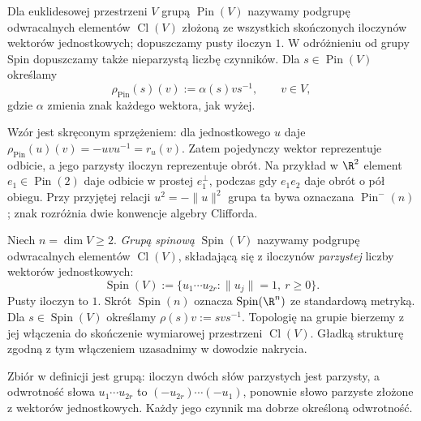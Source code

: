\begin{definicja}
\label{def:pin-grupa}
Dla euklidesowej przestrzeni $V$ grupą $\operatorname{Pin}(V)$
nazywamy podgrupę odwracalnych elementów $\operatorname{Cl}(V)$
złożoną ze wszystkich skończonych iloczynów wektorów
jednostkowych; dopuszczamy pusty iloczyn $1$.
W odróżnieniu od grupy Spin dopuszczamy także nieparzystą
liczbę czynników. Dla $s\in\operatorname{Pin}(V)$ określamy
\[
 \rho_{\mathrm{Pin}}(s)(v):=\alpha(s)v s^{-1},
 \qquad v\in V,
\]
gdzie $\alpha$ zmienia znak każdego wektora, jak wyżej.
\end{definicja}

Wzór jest skręconym sprzężeniem: dla jednostkowego $u$
daje $\rho_{\mathrm{Pin}}(u)(v)=-uvu^{-1}=r_u(v)$.
Zatem pojedynczy wektor reprezentuje odbicie, a jego parzysty
iloczyn reprezentuje obrót. Na przykład w $\R^2$ element
$e_1\in\operatorname{Pin}(2)$ daje odbicie w prostej
$e_1^\perp$, podczas gdy $e_1e_2$ daje obrót o pół obiegu.
Przy przyjętej relacji $u^2=-\|u\|^2$ grupa ta bywa
oznaczana $\operatorname{Pin}^{-}(n)$; znak rozróżnia dwie
konwencje algebry Clifforda.

\begin{definicja}
\label{def:spin-grupa}
Niech $n=\dim V\geq2$. \emph{Grupą spinową}
$\operatorname{Spin}(V)$ nazywamy podgrupę
odwracalnych elementów $\operatorname{Cl}(V)$,
składającą się z iloczynów \emph{parzystej}
liczby wektorów jednostkowych:
\[
 \operatorname{Spin}(V)
 :=\{u_1\cdots u_{2r}:\|u_j\|=1,\ r\geq0\}.
\]
Pusty iloczyn to $1$. Skrót
$\operatorname{Spin}(n)$ oznacza
$\operatorname{Spin}(\R^n)$ ze standardową metryką.
Dla $s\in\operatorname{Spin}(V)$ określamy
$\rho(s)v:=svs^{-1}$.
Topologię na grupie bierzemy z jej włączenia do skończenie
wymiarowej przestrzeni $\operatorname{Cl}(V)$. Gładką strukturę
zgodną z tym włączeniem uzasadnimy w dowodzie nakrycia.
\end{definicja}

Zbiór w definicji jest grupą: iloczyn dwóch słów
parzystych jest parzysty, a odwrotność słowa
$u_1\cdots u_{2r}$ to
$(-u_{2r})\cdots(-u_1)$, ponownie słowo parzyste
złożone z wektorów jednostkowych.
Każdy jego czynnik ma dobrze określoną odwrotność.

